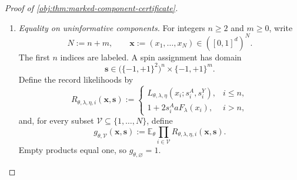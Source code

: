 \documentclass[11pt]{article}
\begin{document}
\begin{proof}[Proof of \cref{obj:thm:marked-component-certificate}]
\begin{enumerate}
The sine-cosine identity on each lattice interval gives a sum of squares equal to one. Tensoring it and multiplying by \(B_h^2\) yields
\[
\sum_{\mathbf z\in\mathcal I}\phi_{\mathbf z}(x)^2=B_h(x)^2.
\]
For \(x\in C_h\), all nonzero tensor entries lie in the prescribed finite index set; for \(x\notin C_h\), both sides vanish. Expanding the finite signed sums therefore gives
\[
\mathbb E_\theta F_\lambda(x)
=
\mathbb E_\theta G_\eta(x)=0,
\qquad
\mathbb E_\theta[F_\lambda(x)G_\eta(x)]
=\frac{\theta}{2}B_h(x)^2.
\]

Set
\[
c_S:=\frac1{64D_d}.
\]
If the amplitude inequalities hold with \(c_S\), then
\[
a,b\le c_S,\qquad
aD_d,bD_d\le\frac1{64},
\qquad
ab\le\frac1{4096}.
\]
Thus the raw propensity and both raw arm probabilities lie in \([0,1]\), at every covariate, so their Bernoulli atom formulas apply directly.

For a labeled record, define the treatment and observed-response spins by
\[
s^A:=2A-1,\qquad
Y:=AY(1)+(1-A)Y(0),\qquad
s^Y:=2Y-1.
\]
Relative to the uniform probability measure on the four spin pairs, its likelihood is
\[
L_{\theta,\lambda,\eta}(x;s^A,s^Y)
:=
(1+2s^AaF_\lambda(x))
(1+2s^YbG_\eta(x)+s^As^Y\tau_\theta(x)).
\]
This follows by multiplying the two Bernoulli atom probabilities, each divided by its fair atom probability. Expanding the product gives
\[
\begin{aligned}
\mathbb E_\theta L_{\theta,\lambda,\eta}(x;s^A,s^Y)
={}&1+s^As^Y\tau_\theta(x)\\
&+\bigl(2s^Aa+2(s^A)^2s^Ya\tau_\theta(x)\bigr)
  \mathbb E_\theta F_\lambda(x)\\
&+2s^Yb\,\mathbb E_\theta G_\eta(x)
+4s^As^Yab\,\mathbb E_\theta[F_\lambda(x)G_\eta(x)]\\
={}&1+s^As^Y
\bigl(-2\theta abB_h(x)^2+2\theta abB_h(x)^2\bigr)
=1.
\end{aligned}
\]
Hence every atom of the singleton labeled mixture has probability \(1/4\). This proves its uniform conditional law for every hypothesis and every cube covariate.

\item \textit{Equality on uninformative components.}
For integers \(n\ge2\) and \(m\ge0\), write
\[
N:=n+m,\qquad
\mathbf x:=(x_1,\ldots,x_N)\in([0,1]^d)^N.
\]
The first \(n\) indices are labeled. A spin assignment has domain
\[
\mathbf s\in
\bigl(\{-1,+1\}^2\bigr)^n
\times\{-1,+1\}^m.
\]
Define the record likelihoods by
\[
R_{\theta,\lambda,\eta,i}(\mathbf x,\mathbf s)
:=
\begin{cases}
L_{\theta,\lambda,\eta}(x_i;s_i^A,s_i^Y),&i\le n,\\
1+2s_i^AaF_\lambda(x_i),&i>n,
\end{cases}
\]
and, for every subset \(\mathcal V\subseteq\{1,\ldots,N\}\), define
\[
g_{\theta,\mathcal V}(\mathbf x,\mathbf s)
:=
\mathbb E_\theta
\prod_{i\in\mathcal V}
R_{\theta,\lambda,\eta,i}(\mathbf x,\mathbf s).
\]
Empty products equal one, so \(g_{\theta,\varnothing}=1\).


\end{enumerate}
\end{proof}
\end{document}
